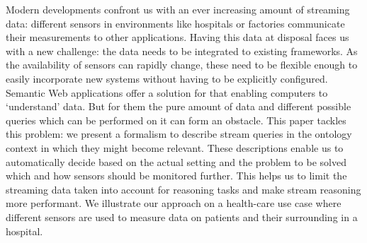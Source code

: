 % 
% 
% 
% 
% 
% 
% 
% 
% 
% 
% 
% 
% 

% 
% 
% 
Modern developments confront us with an ever increasing amount of streaming data: different sensors in environments like hospitals or factories 
communicate their measurements to other applications. Having this data at disposal faces us with a new challenge: the data needs to be integrated to
existing frameworks. As the availability of sensors can rapidly change, these need to be flexible enough to easily incorporate new systems without having to be explicitly
 configured. Semantic Web applications offer a solution for that enabling computers to `understand' data. 
But for them the pure amount of data and different possible queries which can be performed on it can
form an obstacle.
This paper tackles this problem:
we present a formalism to describe 
stream queries in the ontology context in which they might become relevant. 
These descriptions enable us to
automatically decide based on the actual setting and the problem to be solved 
which and how sensors should be monitored further. 
This helps us to limit the streaming data taken into account for
reasoning tasks and make stream reasoning more performant. 
We illustrate our approach on a health-care use case where different sensors are used to measure data on patients and their surrounding in a hospital.
% 

